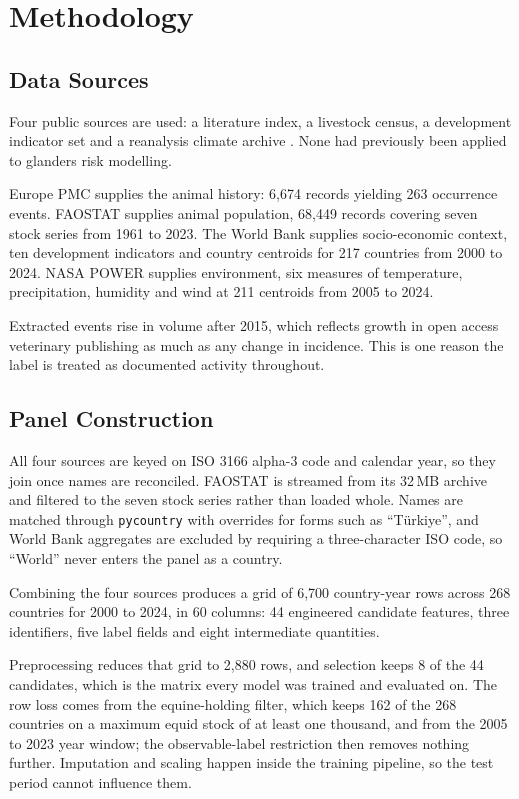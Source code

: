 \documentclass[10pt,openany]{report}
\begin{document}
\chapter{Methodology}
\label{ch:method}

\section{Data Sources}

Four public sources are used: a literature index, a livestock census, a development indicator set and
a reanalysis climate archive \cite{europepmc,faostat,wdi,power}. None had previously been applied to
glanders risk modelling.

Europe PMC supplies the animal history: 6,674 records yielding 263 occurrence
events. FAOSTAT supplies animal population, 68,449 records covering seven stock series from 1961 to
2023. The World Bank supplies socio-economic context, ten development indicators and country
centroids for 217 countries from 2000 to 2024. NASA POWER supplies environment, six measures of
temperature, precipitation, humidity and wind at 211 centroids from 2005 to 2024.

Extracted events rise in volume after 2015, which reflects growth in open access veterinary
publishing as much as any change in incidence. This is one reason the label is treated as
documented activity throughout.

\section{Panel Construction}

All four sources are keyed on ISO 3166 alpha-3 code and calendar year, so they join once names are
reconciled. FAOSTAT is streamed from its 32\,MB archive and filtered to the seven stock series rather
than loaded whole. Names are matched through \texttt{pycountry} with overrides for forms such as
``T\"urkiye'', and World Bank aggregates are excluded by requiring a three-character ISO code, so
``World'' never enters the panel as a country.

Combining the four sources produces a grid of 6,700 country-year rows across
268 countries for 2000 to 2024, in 60 columns: 44 engineered candidate features, three
identifiers, five label fields and eight intermediate quantities.

Preprocessing reduces that grid to 2,880 rows, and selection keeps 8 of the 44 candidates, which
is the matrix every model was trained and evaluated on. The row loss comes from the equine-holding
filter, which keeps 162 of the 268 countries on a maximum equid stock of at least one
thousand, and from the 2005 to 2023 year window; the observable-label restriction then removes nothing
further. Imputation and scaling happen inside the training pipeline, so the test period cannot
influence them.
\end{document}
